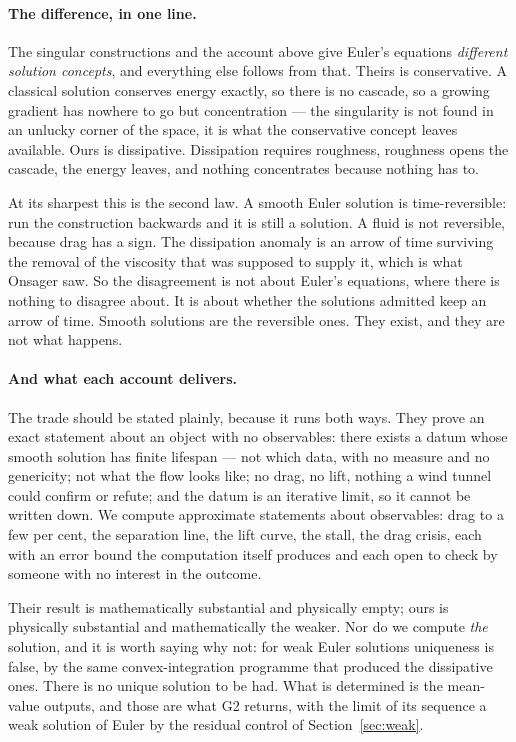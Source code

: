 \documentclass[11pt]{article}
\begin{document}
\paragraph{The difference, in one line.} The singular constructions and the account above give
Euler's equations \emph{different solution concepts}, and everything else follows from that. Theirs
is conservative. A classical solution conserves energy exactly, so there is no cascade, so a growing
gradient has nowhere to go but concentration --- the singularity is not found in an unlucky corner
of the space, it is what the conservative concept leaves available. Ours is dissipative. Dissipation
requires roughness, roughness opens the cascade, the energy leaves, and nothing concentrates because
nothing has to.

At its sharpest this is the second law. A smooth Euler solution is time-reversible: run the
construction backwards and it is still a solution. A fluid is not reversible, because drag has a
sign. The dissipation anomaly is an arrow of time surviving the removal of the viscosity that was
supposed to supply it, which is what Onsager saw. So the disagreement is not about Euler's
equations, where there is nothing to disagree about. It is about whether the solutions admitted keep
an arrow of time. Smooth solutions are the reversible ones. They exist, and they are not what
happens.

\paragraph{And what each account delivers.} The trade should be stated plainly, because it runs both
ways. They prove an exact statement about an object with no observables: there exists a datum whose
smooth solution has finite lifespan --- not which data, with no measure and no genericity; not what
the flow looks like; no drag, no lift, nothing a wind tunnel could confirm or refute; and the datum
is an iterative limit, so it cannot be written down. We compute approximate statements about
observables: drag to a few per cent, the separation line, the lift curve, the stall, the drag
crisis, each with an error bound the computation itself produces and each open to check by someone
with no interest in the outcome.

Their result is mathematically substantial and physically empty; ours is physically substantial and
mathematically the weaker. Nor do we compute \emph{the} solution, and it is worth saying why not:
for weak Euler solutions uniqueness is false, by the same convex-integration programme that produced
the dissipative ones. There is no unique solution to be had. What is determined is the mean-value
outputs, and those are what G2 returns, with the limit of its sequence a weak solution of Euler by
the residual control of Section~\ref{sec:weak}.
\end{document}
